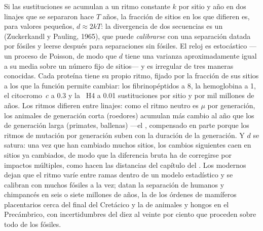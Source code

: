 \begin{proposition}\label{prop:b3:molecular-evolution:clock}
Si las sustituciones se acumulan a un ritmo constante $k$ por sitio y
año en dos linajes que se separaron hace $T$ años, la fracción de
sitios en los que difieren es, para valores pequeños,
$d \approx 2kT$: la divergencia de dos secuencias es un \emph{} (Zuckerkandl y Pauling, 1965), que puede \emph{calibrarse}
con una separación datada por fósiles y leerse después para
separaciones sin fósiles. El reloj es estocástico ---un proceso de
Poisson, de modo que $d$ tiene una varianza aproximadamente igual a su
media sobre un número fijo de sitios--- y es irregular de tres maneras
conocidas. Cada proteína tiene su propio ritmo, fijado por la fracción
de sus sitios a los que la función permite cambiar: los fibrinopéptidos
a \num{8}, la hemoglobina a \num{1}, el citocromo~$c$ a \num{0.3} y la
~H4 a \num{0.01} sustituciones por sitio y por mil millones de
años. Los ritmos difieren entre linajes: como el ritmo neutro es $\mu$
por generación, los animales de generación corta (roedores) acumulan
más cambio al año que los de generación larga (primates, ballenas)
---el \emph{}, compensado en parte
porque los ritmos de mutación por generación suben con la duración de
la generación. Y $d$ se satura: una vez que han cambiado muchos sitios,
los cambios siguientes caen en sitios ya cambiados, de modo que la
diferencia bruta ha de corregirse por impactos múltiples, como hacen
las distancias del capítulo del . Los \emph{} modernos dejan que el ritmo varíe entre ramas dentro de un
modelo estadístico y se calibran con muchos fósiles a la vez; datan la
separación de humanos y chimpancés en seis o siete millones de años, la
de los órdenes de mamíferos placentarios cerca del final del Cretácico
y la de animales y hongos en el Precámbrico, con incertidumbres del
diez al veinte por ciento que proceden sobre todo de los fósiles.
\end{proposition}
